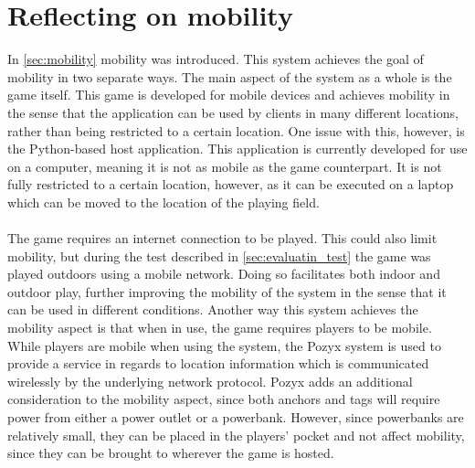 \section{Reflecting on mobility}\label{sec:mobility-reflection}
In \autoref{sec:mobility} mobility was introduced.
This system achieves the goal of mobility in two separate ways.
The main aspect of the system as a whole is the game itself.
This game is developed for mobile devices and achieves mobility in the sense that the application can be used by clients in many different locations, rather than being restricted to a certain location.
One issue with this, however, is the Python-based host application.
This application is currently developed for use on a computer, meaning it is not as mobile as the game counterpart.
It is not fully restricted to a certain location, however, as it can be executed on a laptop which can be moved to the location of the playing field.
\\\\
The game requires an internet connection to be played.
This could also limit mobility, but during the test described in \autoref{sec:evaluatin_test} the game was played outdoors using a mobile network.
Doing so facilitates both indoor and outdoor play, further improving the mobility of the system in the sense that it can be used in different conditions.
Another way this system achieves the mobility aspect is that when in use, the game requires players to be mobile.
While players are mobile when using the system, the Pozyx system is used to provide a service in regards to location information which is communicated wirelessly by the underlying network protocol.
Pozyx adds an additional consideration to the mobility aspect, since both anchors and tags will require power from either a power outlet or a powerbank.
However, since powerbanks are relatively small, they can be placed in the players' pocket and not affect mobility, since they can be brought to wherever the game is hosted.